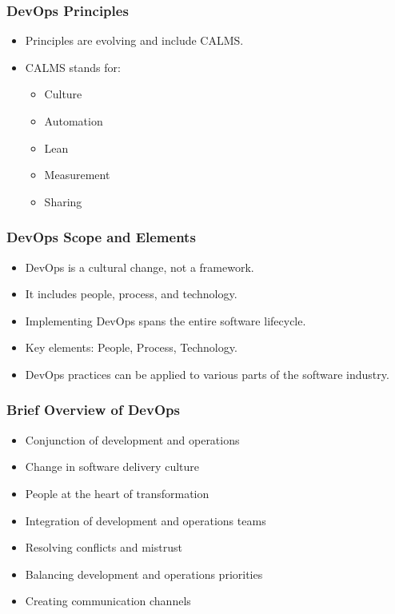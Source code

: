 \documentclass[aspectratio=169, table]{beamer}
\begin{document}
\begin{frame}
	\frametitle{DevOps Principles}
	\begin{itemize}
		\item Principles are evolving and include CALMS.
		\item CALMS stands for:
		\begin{itemize}
			\item Culture
			\item Automation
			\item Lean
			\item Measurement
			\item Sharing
		\end{itemize}
	\end{itemize}
\end{frame}

\begin{frame}
	\frametitle{DevOps Scope and Elements}
	\begin{itemize}
		\item DevOps is a cultural change, not a framework.
		\item It includes people, process, and technology.
		\item Implementing DevOps spans the entire software lifecycle.
		\item Key elements: People, Process, Technology.
		\item DevOps practices can be applied to various parts of the software industry.
	\end{itemize}
\end{frame}

\begin{frame}
	\frametitle{Brief Overview of DevOps}
	\begin{itemize}
		\item Conjunction of development and operations
		\item Change in software delivery culture
		\item People at the heart of transformation
		\item Integration of development and operations teams
		\item Resolving conflicts and mistrust
		\item Balancing development and operations priorities
		\item Creating communication channels
	\end{itemize}
\end{frame}
\end{document}
